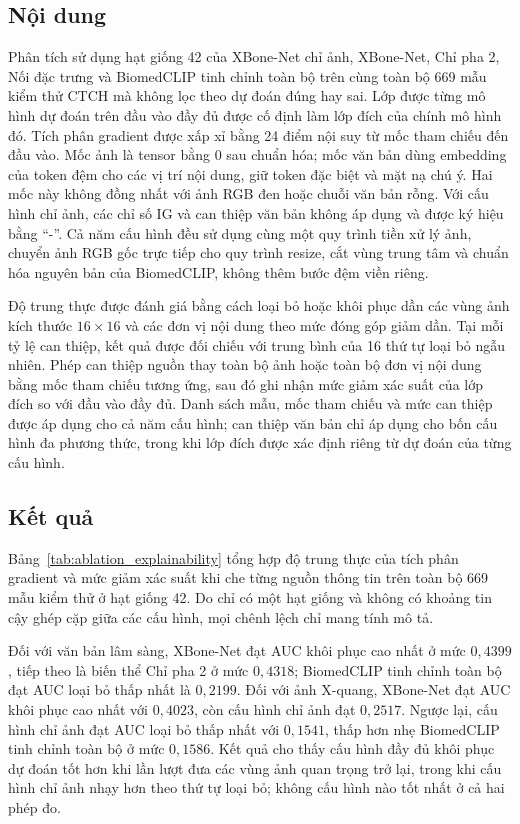 \subsection{Nội dung}
Phân tích sử dụng hạt giống 42 của XBone-Net chỉ ảnh, XBone-Net, Chỉ pha 2, Nối đặc trưng và BiomedCLIP tinh chỉnh toàn bộ trên cùng toàn bộ 669 mẫu kiểm thử CTCH mà không lọc theo dự đoán đúng hay sai. Lớp được từng mô hình dự đoán trên đầu vào đầy đủ được cố định làm lớp đích của chính mô hình đó. Tích phân gradient được xấp xỉ bằng 24 điểm nội suy từ mốc tham chiếu đến đầu vào. Mốc ảnh là tensor bằng 0 sau chuẩn hóa; mốc văn bản dùng embedding của token đệm cho các vị trí nội dung, giữ token đặc biệt và mặt nạ chú ý. Hai mốc này không đồng nhất với ảnh RGB đen hoặc chuỗi văn bản rỗng. Với cấu hình chỉ ảnh, các chỉ số IG và can thiệp văn bản không áp dụng và được ký hiệu bằng ``-''. Cả năm cấu hình đều sử dụng cùng một quy trình tiền xử lý ảnh, chuyển ảnh RGB gốc trực tiếp cho quy trình resize, cắt vùng trung tâm và chuẩn hóa nguyên bản của BiomedCLIP, không thêm bước đệm viền riêng.

Độ trung thực được đánh giá bằng cách loại bỏ hoặc khôi phục dần các vùng ảnh kích thước $16\times16$ và các đơn vị nội dung theo mức đóng góp giảm dần. Tại mỗi tỷ lệ can thiệp, kết quả được đối chiếu với trung bình của 16 thứ tự loại bỏ ngẫu nhiên. Phép can thiệp nguồn thay toàn bộ ảnh hoặc toàn bộ đơn vị nội dung bằng mốc tham chiếu tương ứng, sau đó ghi nhận mức giảm xác suất của lớp đích so với đầu vào đầy đủ. Danh sách mẫu, mốc tham chiếu và mức can thiệp được áp dụng cho cả năm cấu hình; can thiệp văn bản chỉ áp dụng cho bốn cấu hình đa phương thức, trong khi lớp đích được xác định riêng từ dự đoán của từng cấu hình.

\subsection{Kết quả}
Bảng~\ref{tab:ablation_explainability} tổng hợp độ trung thực của tích phân gradient và mức giảm xác suất khi che từng nguồn thông tin trên toàn bộ 669 mẫu kiểm thử ở hạt giống 42. Do chỉ có một hạt giống và không có khoảng tin cậy ghép cặp giữa các cấu hình, mọi chênh lệch chỉ mang tính mô tả.



Đối với văn bản lâm sàng, XBone-Net đạt AUC khôi phục cao nhất ở mức $0{,}4399$, tiếp theo là biến thể Chỉ pha 2 ở mức $0{,}4318$; BiomedCLIP tinh chỉnh toàn bộ đạt AUC loại bỏ thấp nhất là $0{,}2199$. Đối với ảnh X-quang, XBone-Net đạt AUC khôi phục cao nhất với $0{,}4023$, còn cấu hình chỉ ảnh đạt $0{,}2517$. Ngược lại, cấu hình chỉ ảnh đạt AUC loại bỏ thấp nhất với $0{,}1541$, thấp hơn nhẹ BiomedCLIP tinh chỉnh toàn bộ ở mức $0{,}1586$. Kết quả cho thấy cấu hình đầy đủ khôi phục dự đoán tốt hơn khi lần lượt đưa các vùng ảnh quan trọng trở lại, trong khi cấu hình chỉ ảnh nhạy hơn theo thứ tự loại bỏ; không cấu hình nào tốt nhất ở cả hai phép đo.

